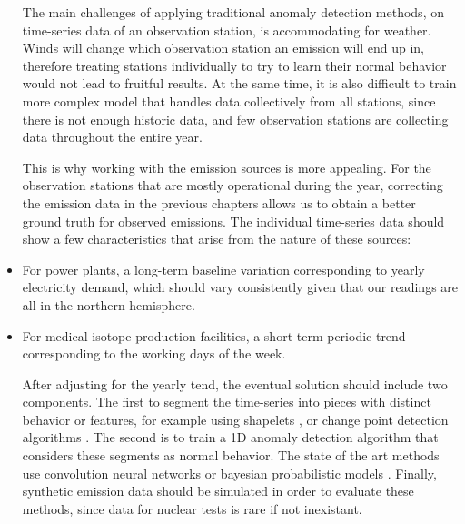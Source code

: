 \documentclass{article}
\begin{document}
\begin{itemize}

The main challenges of applying traditional anomaly detection methods, on time-series data of an observation station, is accommodating for weather. Winds will change which observation station an emission will end up in, therefore treating stations individually to try to learn their normal behavior would not lead to fruitful results. At the same time, it is also difficult to train more complex model that handles data collectively from all stations, since there is not enough historic data, and few observation stations are collecting data throughout the entire year.

This is why working with the emission sources is more appealing. For the observation stations that are mostly operational during the year, correcting the emission data in the previous chapters allows us to obtain a better ground truth for observed emissions. The individual time-series data should show a few characteristics that arise from the nature of these sources:
    \item For power plants, a long-term baseline variation corresponding to yearly electricity demand, which should vary consistently given that our readings are all in the northern hemisphere.
    \item For medical isotope production facilities, a short term periodic trend corresponding to the working days of the week.
    
After adjusting for the yearly tend, the eventual solution should include two components. The first to segment the time-series into pieces with distinct behavior or features, for example using shapelets \cite{10.1145/2623330.2623613},\cite{10.1007/978-3-030-39098-3_7} or change point detection algorithms \cite{TRUONG2020107299}. The second is to train a 1D anomaly detection algorithm that considers these segments as normal behavior. The state of the art methods use convolution neural networks \cite{KIRANYAZ2021107398} or bayesian probabilistic models \cite{https://doi.org/10.48550/arxiv.1902.08627}. Finally, synthetic emission data should be simulated in order to evaluate these methods, since data for nuclear tests is rare if not inexistant.
    
\end{itemize}
    
\printbibliography
\end{document}
